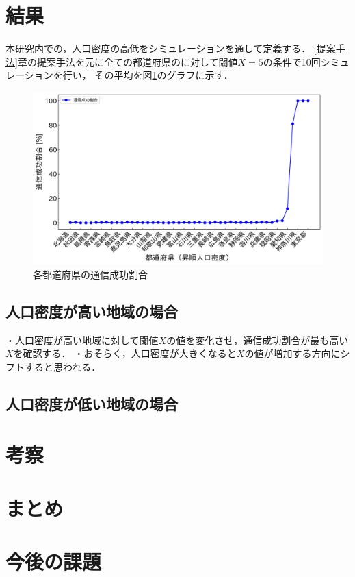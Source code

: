 \documentclass[a4paper, 11pt]{ltjsarticle}
\begin{document}
\clearpage
\section{結果}
本研究内での，人口密度の高低をシミュレーションを通して定義する．
\ref{提案手法}章の提案手法を元に全ての都道府県のに対して閾値$X = 5$の条件で10回シミュレーションを行い，
その平均を図\ref{figure:各都道府県の通信成功割合}のグラフに示す．

\begin{figure}[h]
  \centering
  \includegraphics[width=125mm]{通信成功率グラフ.png}
  \caption{各都道府県の通信成功割合}
  \label{figure:各都道府県の通信成功割合}
\end{figure}

\subsection{人口密度が高い地域の場合}
・人口密度が高い地域に対して閾値$X$の値を変化させ，通信成功割合が最も高い$X$を確認する．
・おそらく，人口密度が大きくなると$X$の値が増加する方向にシフトすると思われる．

\subsection{人口密度が低い地域の場合}

\clearpage
\section{考察}

\section{まとめ}

\section{今後の課題}

\clearpage
{}


\end{document}
